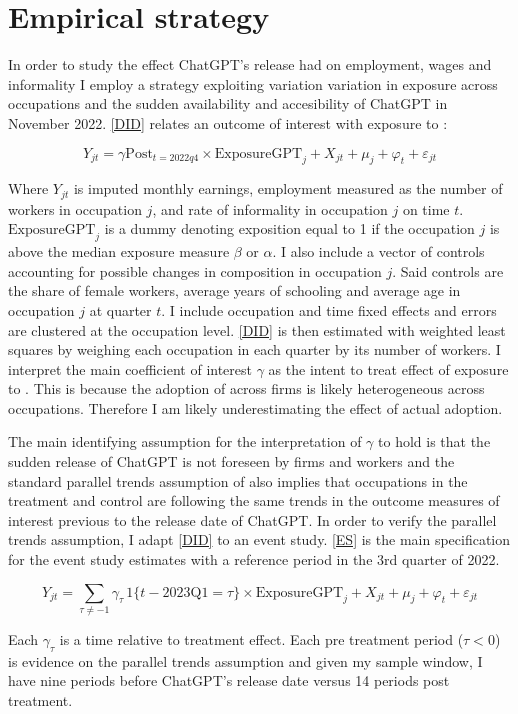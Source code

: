 \section{Empirical strategy}

In order to study the effect ChatGPT's release had on employment, wages and informality I employ a  strategy exploiting variation variation in exposure across occupations and the sudden availability and accesibility of ChatGPT in November 2022. \cref{DID} relates an outcome of interest with exposure to :

\begin{equation}
    \label{DID}
    Y_{jt} = \gamma \text{Post}_{t=2022q4} \times \text{ExposureGPT}_j + X_{jt} + \mu_j + \varphi_t + \varepsilon_{jt}
\end{equation}

Where $Y_{jt}$ is imputed monthly earnings, employment measured as the number of workers in occupation $j$, and rate of informality in occupation $j$ on time $t$. $\text{ExposureGPT}_j$ is a dummy denoting exposition equal to 1 if the occupation $j$ is above the median exposure measure $\beta$ or $\alpha$. I also include a vector of controls accounting for possible changes in composition in occupation $j$. Said controls are the share of female workers, average years of schooling and average age in occupation $j$ at quarter $t$. I include occupation and time fixed effects and errors are clustered at the occupation level. \cref{DID} is then estimated with weighted least squares by weighing each occupation in each quarter by its number of workers. I interpret the main coefficient of interest $\gamma$ as the intent to treat effect of exposure to . This is because the adoption of  across firms is likely heterogeneous across occupations. Therefore I am likely underestimating the effect of actual adoption.

The main identifying assumption for the interpretation of $\gamma$ to hold is that the sudden release of ChatGPT is not foreseen by firms and workers and the standard parallel trends assumption of  also implies that occupations in the treatment and control are following the same trends in the outcome measures of interest previous to the release date of ChatGPT. In order to verify the parallel trends assumption, I adapt \cref{DID} to an event study. \cref{ES} is the main specification for the event study estimates with a reference period in the 3rd quarter of 2022.

\begin{equation}
    \label{ES}
    Y_{jt} = \sum_{\tau \neq -1} \gamma_\tau \, \text{1} \{t - 2023\text{Q}1 = \tau\} \times \text{ExposureGPT}_j + X_{jt} + \mu_j + \varphi_t + \varepsilon_{jt}
\end{equation}

Each $\gamma_{\tau}$ is a time relative to treatment effect. Each pre treatment period ($\tau < 0$) is evidence on the parallel trends assumption and given my sample window, I have nine periods before ChatGPT's release date versus 14 periods post treatment.

